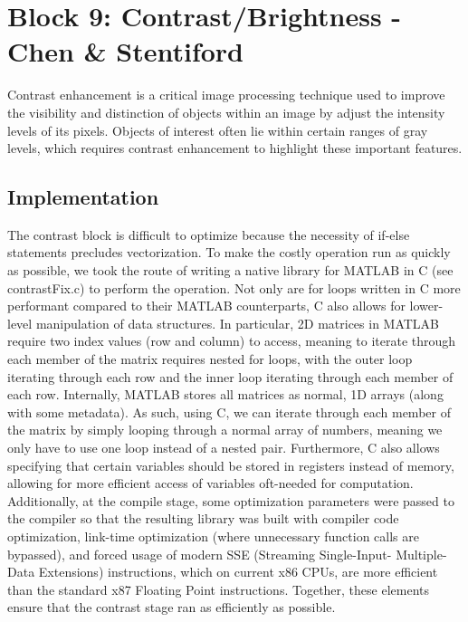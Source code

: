 
\section{Block 9: Contrast/Brightness - Chen \& Stentiford}

Contrast enhancement is a critical image processing technique used to improve the visibility and
distinction of objects within an image by adjust the intensity levels of its pixels. Objects of
interest often lie within certain ranges of gray levels, which requires contrast enhancement to
highlight these important features.


\subsection{Implementation}

The contrast block is difficult to optimize because the necessity of if-else statements precludes 
vectorization. To make the costly operation run as quickly as possible, we took the route of 
writing a native library for MATLAB in C (see contrastFix.c) to perform the operation. Not only 
are for loops written in C more performant compared to their MATLAB counterparts, C also allows 
for lower-level manipulation of data structures. In particular, 2D matrices in MATLAB require 
two index values (row and column) to access, meaning to iterate through each member of the matrix 
requires nested for loops, with the outer loop iterating through each row and the inner loop 
iterating through each member of each row. Internally, MATLAB stores all matrices as normal, 1D 
arrays (along with some metadata). As such, using C, we can iterate through each member of the matrix 
by simply looping through a normal array of numbers, meaning we only have to use one loop instead 
of a nested pair. Furthermore, C also allows specifying that certain variables should be stored in 
registers instead of memory, allowing for more efficient access of variables oft-needed for computation. 
Additionally, at the compile stage, some optimization parameters were passed to the compiler so that 
the resulting library was built with compiler code optimization, link-time optimization (where 
unnecessary function calls are bypassed), and forced usage of modern SSE (Streaming Single-Input-
Multiple-Data Extensions) instructions, which on current x86 CPUs, are more efficient than the 
standard x87 Floating Point instructions. Together, these elements ensure that the contrast stage 
ran as efficiently as possible.